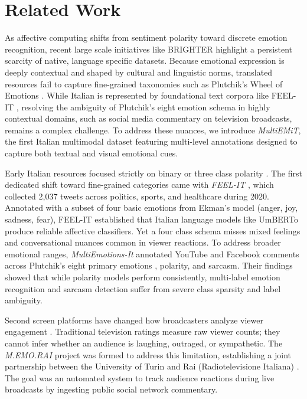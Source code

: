 \section{Related Work}
\label{sec:related_works}

As affective computing shifts from sentiment polarity \cite{SOMSA} toward discrete emotion recognition, recent large scale initiatives like BRIGHTER \cite{brighter_project} highlight a persistent scarcity of native, language specific datasets. Because emotional expression is deeply contextual and shaped by cultural and linguistic norms, translated resources fail to capture fine-grained taxonomies such as Plutchik's Wheel of Emotions \cite{Plutchik, mohammad2018semeval}. While Italian is represented by foundational text corpora like FEEL-IT \cite{bianchi2021feel}, resolving the ambiguity of Plutchik's eight emotion schema in highly contextual domains, such as social media commentary on television broadcasts, remains a complex challenge. To address these nuances, we introduce \textit{MultiEMiT}, the first Italian multimodal dataset featuring multi-level annotations designed to capture both textual and visual emotional cues.

Early Italian resources focused strictly on binary or three class polarity \cite{barbieri2016sentipolc}. The first dedicated shift toward fine-grained categories came with \textit{FEEL-IT} \cite{bianchi2021feel}, which collected 2,037 tweets across politics, sports, and healthcare during 2020. Annotated with a subset of four basic emotions from Ekman's model \cite{ekman1992argument} (anger, joy, sadness, fear), FEEL-IT established that Italian language models like UmBERTo \cite{musixmatch-2020-umberto} produce reliable affective classifiers. Yet a four class schema misses mixed feelings and conversational nuances common in viewer reactions. To address broader emotional ranges, \textit{MultiEmotions-It} \cite{MultiEmotion} annotated YouTube and Facebook comments across Plutchik's eight primary emotions \cite{Plutchik}, polarity, and sarcasm. Their findings showed that while polarity models perform consistently, multi-label emotion recognition and sarcasm detection suffer from severe class sparsity and label ambiguity.

Second screen platforms have changed how broadcasters analyze viewer engagement \cite{SocialTV}. Traditional television ratings measure raw viewer counts; they cannot infer whether an audience is laughing, outraged, or sympathetic. The \textit{M.EMO.RAI} project was formed to address this limitation, establishing a joint partnership between the University of Turin and Rai (Radiotelevisione Italiana) \cite{memorai}. The goal was an automated system to track audience reactions during live broadcasts by ingesting public social network commentary.

